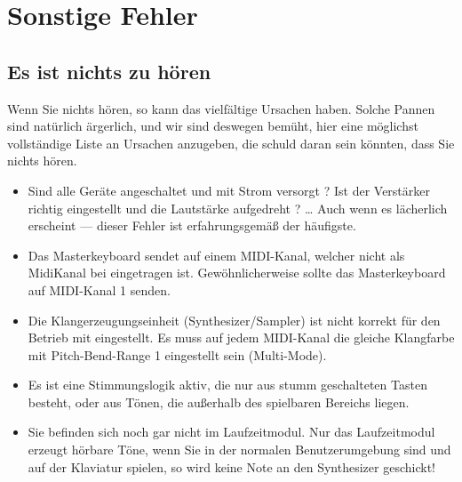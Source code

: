 \section{Sonstige Fehler}\label{sec:sonstige-fehler}

\subsection{Es ist nichts zu hören}\label{sec:es-ist-nichts}

Wenn Sie nichts hören, so kann das vielfältige Ursachen haben.  Solche
Pannen sind natürlich ärgerlich, und wir sind deswegen bemüht, hier
eine möglichst vollständige Liste an Ursachen anzugeben, die schuld
daran sein könnten, dass Sie nichts hören.

\begin{itemize}
\small

\item Sind alle Geräte angeschaltet und mit Strom versorgt ? Ist der
  Verstärker richtig eingestellt und die Lautstärke aufgedreht ? \dots{}
  Auch wenn es lächerlich erscheint --- dieser Fehler ist
  erfahrungsgemäß der häufigste.

\item Das Masterkeyboard sendet auf einem MIDI-Kanal, welcher nicht
  als MidiKanal bei \mutabor{} eingetragen ist. Gewöhnlicherweise
  sollte das Masterkeyboard auf MIDI-Kanal 1 senden.

\item Die Klangerzeugungseinheit (Synthesizer/Sampler) ist nicht
  korrekt für den Betrieb mit \mutabor{} eingestellt. Es muss auf jedem
  MIDI-Kanal die gleiche Klangfarbe mit Pitch-Bend-Range 1 eingestellt
  sein (Multi-Mode). 
\iffalse
 Ausnahme: der Yamaha FB-01. Hier könnte es sein,
  dass der Synthesizer angeschaltet wurde, \emph{nachdem} das
  Laufzeitmodul aktiviert wurde.  Der FB-01 hat den
  Initialisierungscode verpasst. Abhilfe: verlassen Sie das
  Laufzeitmodul und starten Sie es erneut.
\fi

\item Es ist eine Stimmungslogik aktiv, die nur aus stumm geschalteten
  Tasten besteht, oder aus Tönen, die außerhalb des spielbaren
  Bereichs liegen.

\item Sie befinden sich noch gar nicht im Laufzeitmodul. Nur das
  Laufzeitmodul erzeugt hörbare Töne, wenn Sie in der normalen
  Benutzerumgebung sind und auf der Klaviatur spielen, so wird keine
  Note an den Synthesizer geschickt!


\end{itemize}
